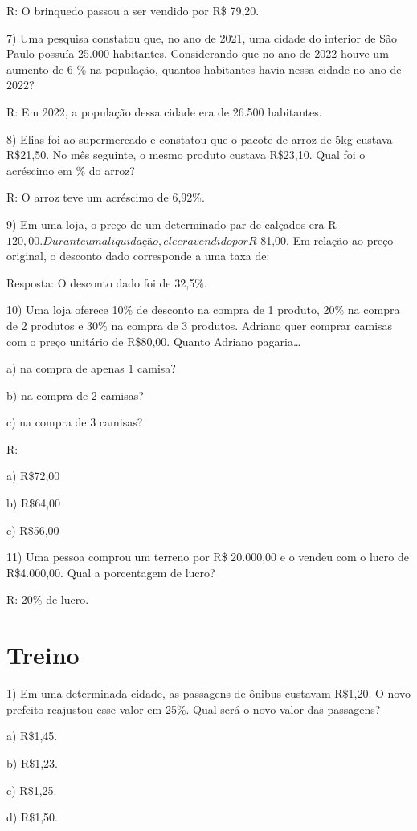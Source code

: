 R: O brinquedo passou a ser vendido por R\$ 79,20.

7) Uma pesquisa constatou que, no ano de 2021, uma cidade do interior de
São Paulo possuía 25.000 habitantes. Considerando que no ano de 2022
houve um aumento de 6 \% na população, quantos habitantes havia nessa
cidade no ano de 2022?

R: Em 2022, a população dessa cidade era de 26.500 habitantes.

8) Elias foi ao supermercado e constatou que o pacote de arroz de 5kg
custava R\$21,50. No mês seguinte, o mesmo produto custava R\$23,10.
Qual foi o acréscimo em \% do arroz?

R: O arroz teve um acréscimo de 6,92\%.

9) Em uma loja, o preço de um determinado par de calçados era
R\(120,00. Durante uma liquidação, ele era vendido por R\) 81,00. Em
relação ao preço original, o desconto dado corresponde a uma taxa de:

Resposta: O desconto dado foi de 32,5\%.

10) Uma loja oferece 10\% de desconto na compra de 1 produto, 20\% na
compra de 2 produtos e 30\% na compra de 3 produtos. Adriano quer
comprar camisas com o preço unitário de R\$80,00. Quanto Adriano
pagaria\ldots{}

a) na compra de apenas 1 camisa?

b) na compra de 2 camisas?

c) na compra de 3 camisas?

R:

a) R\$72,00

b) R\$64,00

c) R\$56,00

11) Uma pessoa comprou um terreno por R\$ 20.000,00 e o vendeu com o
lucro de R\$4.000,00. Qual a porcentagem de lucro?

R: 20\% de lucro.

\section{Treino}

1) Em uma determinada cidade, as passagens de ônibus custavam R\$1,20. O
novo prefeito reajustou esse valor em 25\%. Qual será o novo valor das
passagens?

a) R\$1,45.

b) R\$1,23.

c) R\$1,25.

d) R\$1,50.

